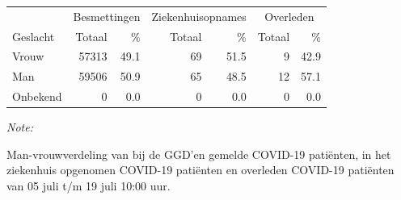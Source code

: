 \documentclass[
  english,
  man,floatsintext]{apa6}
\begin{document}
\begin{table}
\centering\begingroup\fontsize{11}{13}\selectfont

\begin{threeparttable}
\begin{tabular}{lrrrrrr}
\toprule
\multicolumn{1}{c}{ } & \multicolumn{2}{c}{Besmettingen} & \multicolumn{2}{c}{Ziekenhuisopnames} & \multicolumn{2}{c}{Overleden} \\
\cmidrule(l{3pt}r{3pt}){2-3} \cmidrule(l{3pt}r{3pt}){4-5} \cmidrule(l{3pt}r{3pt}){6-7}
Geslacht & Totaal & \% & Totaal & \% & Totaal & \%\\
\midrule
Vrouw & 57313 & 49.1 & 69 & 51.5 & 9 & 42.9\\
Man & 59506 & 50.9 & 65 & 48.5 & 12 & 57.1\\
Onbekend & 0 & 0.0 & 0 & 0.0 & 0 & 0.0\\
\bottomrule
\end{tabular}
\begin{tablenotes}
\item \textit{Note: } 
\item Man-vrouwverdeling van bij de GGD’en gemelde COVID-19 patiënten, in het ziekenhuis opgenomen COVID-19 patiënten en overleden COVID-19 patiënten van 05 juli t/m 19 juli 10:00 uur.
\end{tablenotes}
\end{threeparttable}
\endgroup{}
\end{table}
\newpage
\end{document}
